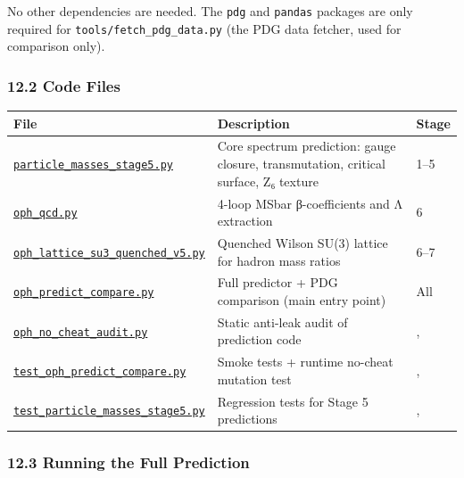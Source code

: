 No other dependencies are needed. The \texttt{pdg} and \texttt{pandas} packages are only required for \texttt{tools/fetch\_pdg\_data.py} (the PDG data fetcher, used for comparison only).

\subsubsection{12.2 Code Files}\label{122-code-files}

{\def\LTcaptype{none} %
\begin{longtable}[]{@{}lll@{}}
\toprule\noalign{}
File & Description & Stage \\
\midrule\noalign{}
\endhead
\bottomrule\noalign{}
\endlastfoot
\href{../code/particles/particle_masses_stage5.py}{\texttt{particle\_masses\_stage5.py}} & Core spectrum prediction: gauge closure, transmutation, critical surface, Z₆ texture & 1--5 \\
\href{../code/particles/oph_qcd.py}{\texttt{oph\_qcd.py}} & 4-loop MSbar β-coefficients and Λ extraction & 6 \\
\href{../code/particles/oph_lattice_su3_quenched_v5.py}{\texttt{oph\_lattice\_su3\_quenched\_v5.py}} & Quenched Wilson SU(3) lattice for hadron mass ratios & 6--7 \\
\href{../code/particles/oph_predict_compare.py}{\texttt{oph\_predict\_compare.py}} & Full predictor + PDG comparison (main entry point) & All \\
\href{../code/particles/oph_no_cheat_audit.py}{\texttt{oph\_no\_cheat\_audit.py}} & Static anti-leak audit of prediction code & , \\
\href{../code/particles/test_oph_predict_compare.py}{\texttt{test\_oph\_predict\_compare.py}} & Smoke tests + runtime no-cheat mutation test & , \\
\href{../code/particles/test_particle_masses_stage5.py}{\texttt{test\_particle\_masses\_stage5.py}} & Regression tests for Stage 5 predictions & , \\
\end{longtable}
}

\subsubsection{12.3 Running the Full Prediction}\label{123-running-the-full-prediction}

